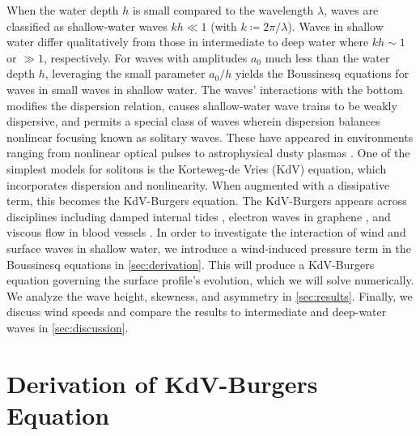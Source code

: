\documentclass{jfm}
\begin{document}
When the water depth $h$ is small compared to the wavelength $\lambda$,
waves are classified as shallow-water waves $kh \ll 1$ (with $k
\coloneqq 2 \pi/\lambda$).
Waves in shallow water differ qualitatively from those in intermediate
to deep water where $kh \sim 1$ or $\gg 1$, respectively.
For waves with amplitudes $a_0$ much less than the water depth $h$,
leveraging the small parameter $a_0/h$ yields the Boussinesq equations
for waves in small waves in shallow water.
The waves' interactions with the bottom modifies the dispersion
relation, causes shallow-water wave trains to be weakly dispersive, and
permits a special class of waves wherein dispersion balances nonlinear
focusing known as solitary waves.
These have appeared in environments ranging from nonlinear optical pulses
\citep[\eg][]{kivshar1993dark} to astrophysical dusty plasmas
\citep[\eg][]{sahu2012nonextensive}.
One of the simplest models for solitons is the Korteweg-de Vries (KdV)
equation, which incorporates dispersion and nonlinearity.
When augmented with a dissipative term, this becomes the KdV-Burgers
equation.
The KdV-Burgers appears across disciplines including damped internal
tides \citep[\eg][]{sandstrom1995dissipation}, electron waves in
graphene \citep[\eg][]{zdyrski2019effects}, and viscous flow in blood
vessels \citep[\eg][]{antar1999weakly}.
In order to investigate the interaction of wind and surface waves in
shallow water, we introduce a wind-induced pressure term in the
Boussinesq equations in \cref{sec:derivation}.
This will produce a KdV-Burgers equation governing the surface profile's
evolution, which we will solve numerically.
We analyze the wave height, skewness, and asymmetry in
\cref{sec:results}.
Finally, we discuss wind speeds and compare the results to intermediate
and deep-water waves in \cref{sec:discussion}.

\section{\label{sec:derivation} Derivation of KdV-Burgers Equation}
\end{document}
